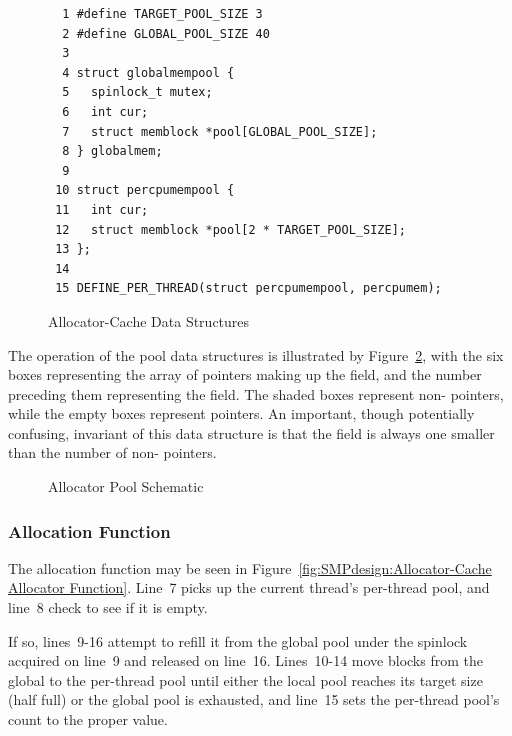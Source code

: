 \begin{figure}[htbp]
{ \scriptsize
\begin{verbatim}
  1 #define TARGET_POOL_SIZE 3
  2 #define GLOBAL_POOL_SIZE 40
  3
  4 struct globalmempool {
  5   spinlock_t mutex;
  6   int cur;
  7   struct memblock *pool[GLOBAL_POOL_SIZE];
  8 } globalmem;
  9
 10 struct percpumempool {
 11   int cur;
 12   struct memblock *pool[2 * TARGET_POOL_SIZE];
 13 };
 14
 15 DEFINE_PER_THREAD(struct percpumempool, percpumem);
\end{verbatim}
}
\caption{Allocator-Cache Data Structures}
\label{fig:SMPdesign:Allocator-Cache Data Structures}
\end{figure}

The operation of the pool data structures is illustrated by
Figure~\ref{fig:SMPdesign:Allocator Pool Schematic},
with the six boxes representing the array of pointers making up
the  field, and the number preceding them representing
the  field.
The shaded boxes represent non- pointers, while the empty
boxes represent  pointers.
An important, though potentially confusing, invariant of this
data structure is that the  field is always one
smaller than the number of non- pointers.

\begin{figure}[htb]
\begin{center}
\end{center}
\caption{Allocator Pool Schematic}
\label{fig:SMPdesign:Allocator Pool Schematic}
\end{figure}

\subsubsection{Allocation Function}

The allocation function  may be seen in
Figure~\ref{fig:SMPdesign:Allocator-Cache Allocator Function}.
Line~7 picks up the current thread's per-thread pool,
and line~8 check to see if it is empty.

If so, lines~9-16 attempt to refill it from the global pool
under the spinlock acquired on line~9 and released on line~16.
Lines~10-14 move blocks from the global to the per-thread pool until
either the local pool reaches its target size (half full) or
the global pool is exhausted, and line~15 sets the per-thread pool's
count to the proper value.

